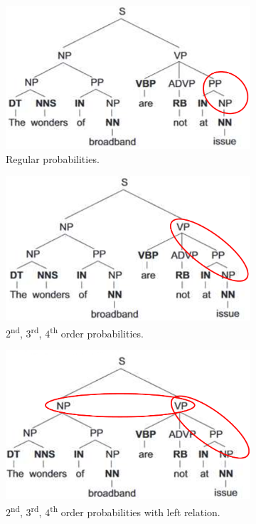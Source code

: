 \begin{figure}[!ht]
    \centering
    \captionsetup{width=.8\linewidth}
    \begin{subfigure}{.32\textwidth}
        \centering
        \captionsetup{width=.8\linewidth}
        \includegraphics[width=.9\linewidth]{images/psg_1.png}
        \caption*{Regular probabilities.}
    \end{subfigure}
    \begin{subfigure}{.32\textwidth}
        \centering
        \captionsetup{width=.8\linewidth}
        \includegraphics[width=.9\linewidth]{images/psg_2.png}
        \caption*{$2$\textsuperscript{nd}, $3$\textsuperscript{rd}, $4$\textsuperscript{th} order probabilities.}
    \end{subfigure}
    \begin{subfigure}{.32\textwidth}
        \centering
        \captionsetup{width=.8\linewidth}
        \includegraphics[width=.9\linewidth]{images/psg_3.png}
        \caption*{$2$\textsuperscript{nd}, $3$\textsuperscript{rd}, $4$\textsuperscript{th} order probabilities with left relation.}
    \end{subfigure}
    \caption{}
    \label{fig:psg_2}
\end{figure}

